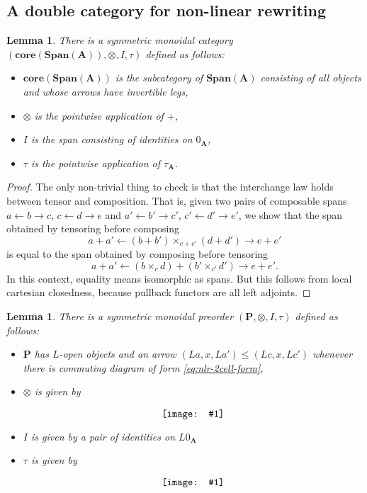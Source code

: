 \documentclass{amsart}
\newcommand{\A}{\cat{A}}
\newcommand{\NonLinArrCat}{\cat{P}}
\newcommand{\core}{\mathbf{core}}
\newcommand{\cat}[1]{\mathbf{#1}}
\newcommand{\diagram}[1]{\raisebox{-0.5\height}{\texttt{[image: \#1]}}}
\newcommand{\Span}{\mathbf{Span}}
\newtheorem{lemma}[theorem]{Lemma}
\theoremstyle{remark}
\theoremstyle{definition}
\begin{document}

\subsection{A double category for non-linear rewriting}
\label{sec:dbl-cat-nonlinr-rewr}

\begin{lemma} \label{thm_dbl-rewr-obcat}
  There is a symmetric monoidal category
  $ ( \core (\Span (\A)) , \otimes , I , \tau ) $ defined as follows:

  \begin{itemize}
    \item $ \core (\Span (\A)) $ is the subcategory of $ \Span (\A) $
      consisting of all objects and whose arrows have invertible legs,
    \item $ \otimes $ is the pointwise application of $ + $,
    \item $ I $ is the span consisting of identities on $ 0_{\A} $,
    \item $ \tau $ is the pointwise application of $ \tau_{\A} $.
  \end{itemize}
\end{lemma}

\begin{proof}
  The only non-trivial thing to check is that the interchange law
  holds between tensor and composition.  That is, given two pairs of
  composable spans $ a \gets b \to c $, $ c \gets d \to e $ and
  $ a' \gets b' \to c' $, $ c' \gets d' \to e' $, we show that the
  span obtained by tensoring before composing
  \[
    a + a' \gets (b + b') \times_{c + c'} (d + d') \to e + e'
  \]
  is equal to the span obtained by composing before tensoring
  \[
    a + a' \gets (b \times_{c} d) + (b' \times_{c'} d') \to e + e'.
  \]
  In this context, equality means isomorphic as spans. But this
  follows from local cartesian closedness, because pullback functors
  are all left adjoints.
\end{proof}

\begin{lemma} \label{thm:dlb-rewr-arrcat}
  There is a symmetric monoidal preorder
  $ ( \NonLinArrCat , \otimes , I , \tau ) $ defined as follows:
  
  \begin{itemize}
  \item $ \NonLinArrCat $ has $ L $-open objects and an arrow
    $ ( La , x , La') \leq ( Lc , x , Lc') $ whenever
    there is commuting diagram of form \eqref{eq:nlr-2cell-form},
   \item $ \otimes $ is given by
       \[
         \diagram{diag_nlr_dbl-rewrite-tensor}
       \]
   \item $ I $ is given by a pair of identities on $ L0_{\A} $
   \item $ \tau $ is given by
     \[
	\diagram{diag_nlr_dbl-rewrite-braiding}
     \]
   \end{itemize}
\end{lemma}
  
\end{document}
